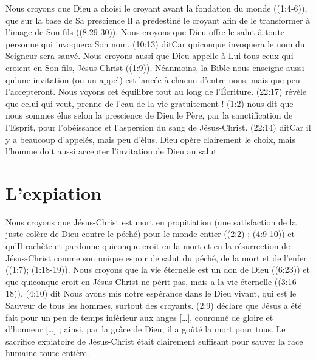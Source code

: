 \begin{digestpar}{}
\begin{pocketpar}{}
Nous croyons que Dieu a choisi le croyant avant la fondation du mon\-de
 ((1:4-6)), que sur la base de Sa prescience
 Il a prédestiné
 le croyant afin de le transformer à l'image de Son fils
 ((8:29-30)).
 Nous croyons que Dieu offre le salut à toute personne qui invoquera Son nom.
 (10:13) dit\frcolon \Og Car quiconque invoquera le nom du Seigneur sera sauvé. \Fg{}
 Nous croyons aussi que Dieu appelle à Lui tous ceux qui croient en Son fils,
 Jésus-Christ ((1:9)).
Néanmoins, la Bible nous enseigne aussi qu'une invitation (ou un appel)
 est lancée à chacun d'entre nous, mais que peu l'accepteront.
 Nous voyons cet équilibre tout au long de l'Écriture.
 (22:17) révèle\frcolon
 \Og [\dots{}] que celui qui veut, prenne de l'eau de la vie gratuitement ! \Fg{}
 (1:2) nous dit que nous sommes \Og élus selon la prescience de Dieu le Père,
 par la sanctification de l'Esprit, pour l'obéissance et l'aspersion du sang de Jésus-Christ. \Fg{}
 (22:14) dit\frcolon \Og Car il y a beaucoup d'appelés, mais peu d'élus. \Fg{}
 Dieu opère clairement le choix, mais l'homme doit aussi accepter l'invitation de Dieu au salut.
\end{pocketpar}
\end{digestpar}


\section*{L'expiation}

\begin{digestpar}{}
\begin{pocketpar}{}
Nous croyons que Jésus-Christ est mort en propitiation
 (une satisfaction de la juste colère de Dieu contre le péché)
 \Og pour le monde entier \Fg{} ((2:2) ; (4:9-10))
 et qu'Il rachète et pardonne quiconque croit en la mort et en la résurrection
 de Jésus-Christ comme son unique espoir de salut du péché, 
 de la mort et de l'en\-fer ((1:7); (1:18-19)).
 Nous croyons que la vie éternelle est un don de Dieu ((6:23))
 et que \Og quiconque croit \Fg{} en Jésus-Christ ne périt pas,
 mais a la vie éternelle ((3:16-18)).
 (4:10) dit\frcolon
 \Og Nous avons mis notre espérance dans le Dieu vivant, qui est le Sauveur
 de tous les hommes, surtout des croyants. \Fg{}
 (2:9) déclare que Jésus
 \Og a été fait pour un peu de temps inférieur aux anges [\dots{}], couronné
 de gloire et d'honneur [\dots{}] ; ainsi, par la grâce de Dieu, il a goûté
 la mort pour tous. \Fg{}
 Le sacrifice expiatoire de Jésus-Christ était clairement suffisant pour sauver
 la race humaine toute entière.
\end{pocketpar}
\end{digestpar}



